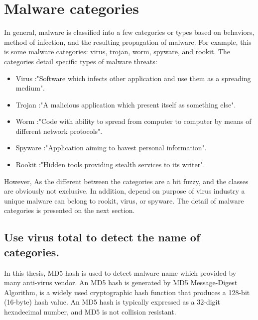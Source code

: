 \section{Malware categories}
In general, malware is classified into a few categories or types based on behaviors, method of infection, and the resulting propagation of malware. For example, this is some malware categories: virus, trojan, worm, spyware, and rookit. The categories detail specific types of malware threats:
\begin{itemize}
\item Virus :"Software which infects other application and use them as a spreading medium"\cite{BlackHat}.
\item Trojan :"A malicious application which present itself as something else"\cite{BlackHat}.
\item Worm :"Code with ability to spread from computer to computer by means of different network protocols"\cite{BlackHat}.
\item Spyware :"Application aiming to havest personal information"\cite{BlackHat}.
\item Rookit :"Hidden tools providing stealth services to its writer"\cite{BlackHat}.
\end{itemize}
However, As the different between the categories are a bit fuzzy, and the classes are obviously not exclusive. In addition, depend on purpose of virus industry a unique malware can belong to rookit, virus, or spyware. The detail of malware categories is presented on the next section. 
\subsection{Use virus total to detect the name of categories.}
In this thesis, MD5 hash is used to detect malware name which provided by many anti-virus vendor. An MD5 hash is generated by MD5 Message-Digest Algorithm, is a widely used cryptographic hash function that produces a 128-bit (16-byte) hash value. An MD5 hash is typically expressed as a 32-digit hexadecimal number, and MD5 is not collision resistant\cite{wiki1}.
